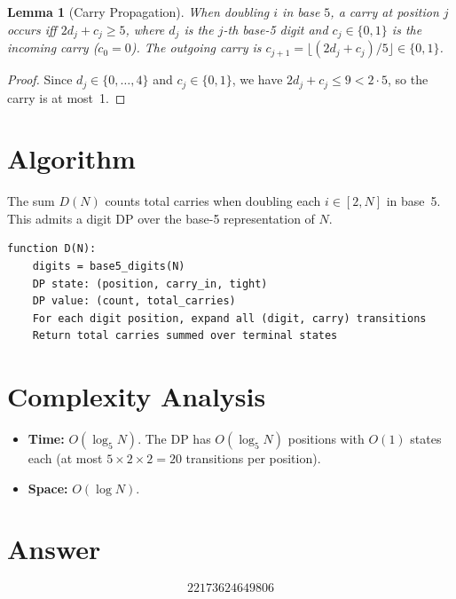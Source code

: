 \documentclass[11pt]{article}
\newtheorem{lemma}[theorem]{Lemma}
\begin{document}
\begin{lemma}[Carry Propagation]
When doubling $i$ in base $5$, a carry at position $j$ occurs iff $2d_j + c_j \ge 5$, where $d_j$ is the $j$-th base-5 digit and $c_j \in \{0,1\}$ is the incoming carry ($c_0 = 0$). The outgoing carry is $c_{j+1} = \lfloor(2d_j + c_j)/5\rfloor \in \{0,1\}$.
\end{lemma}

\begin{proof}
Since $d_j \in \{0,\ldots,4\}$ and $c_j \in \{0,1\}$, we have $2d_j + c_j \le 9 < 2 \cdot 5$, so the carry is at most~1.
\end{proof}

\section{Algorithm}

The sum $D(N)$ counts total carries when doubling each $i \in [2, N]$ in base~5. This admits a digit DP over the base-5 representation of $N$.

\begin{verbatim}
function D(N):
    digits = base5_digits(N)
    DP state: (position, carry_in, tight)
    DP value: (count, total_carries)
    For each digit position, expand all (digit, carry) transitions
    Return total carries summed over terminal states
\end{verbatim}

\section{Complexity Analysis}

\begin{itemize}
\item \textbf{Time:} $O(\log_5 N)$. The DP has $O(\log_5 N)$ positions with $O(1)$ states each (at most $5 \times 2 \times 2 = 20$ transitions per position).
\item \textbf{Space:} $O(\log N)$.
\end{itemize}

\section{Answer}

\[
\boxed{22173624649806}
\]
\end{document}
